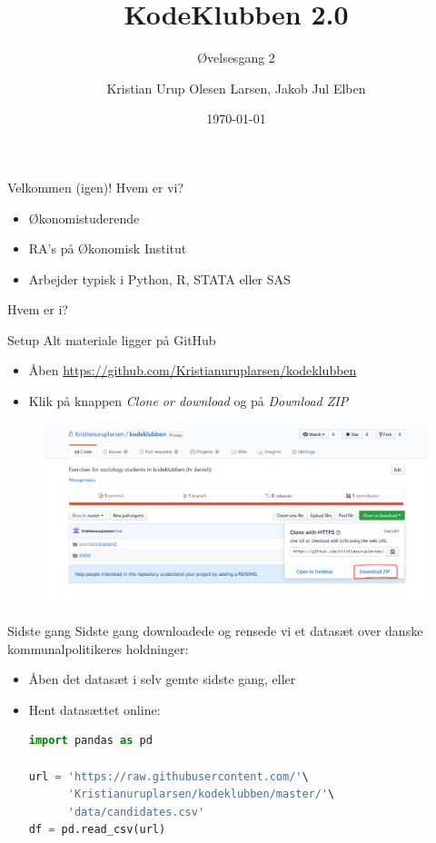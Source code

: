 \documentclass[10pt]{beamer}
\title{KodeKlubben 2.0}
\subtitle{Øvelsesgang 2}
\date{\today}
\author{Kristian Urup Olesen Larsen, Jakob Jul Elben}
\institute{Økonomisk Institut, KU}
\begin{document}
\maketitle

\begin{frame}[fragile]{Velkommen (igen)!}
Hvem er vi?
\begin{itemize}
  \item Økonomistuderende
  \item RA's på Økonomisk Institut
  \item Arbejder typisk i Python, R, STATA eller SAS
\end{itemize}
Hvem er i?
\end{frame}

\begin{frame}[fragile]{Setup}
  Alt materiale ligger på GitHub
\begin{itemize}
  \item Åben \href{https://github.com/Kristianuruplarsen/kodeklubben}{https://github.com/Kristianuruplarsen/kodeklubben}
  \item Klik på knappen \textit{Clone or download} og på \textit{Download ZIP}
\end{itemize}

\begin{figure}
  \center
  \includegraphics[width=\textwidth]{figs/setup.PNG}
\end{figure}
\end{frame}

\begin{frame}[fragile]{Sidste gang}
Sidste gang downloadede og rensede vi et datasæt over danske kommunalpolitikeres holdninger:
\begin{itemize}
  \item Åben det datasæt i selv gemte sidste gang, eller
  \item Hent datasættet online:
  \begin{lstlisting}[language=python]
import pandas as pd

url = 'https://raw.githubusercontent.com/'\
      'Kristianuruplarsen/kodeklubben/master/'\
      'data/candidates.csv'
df = pd.read_csv(url)
  \end{lstlisting}
\end{itemize}
\end{frame}
\end{document}
